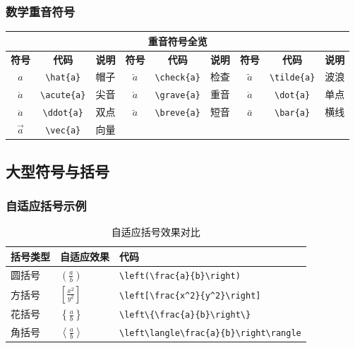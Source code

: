 \documentclass{article}
\begin{document}
\subsubsection{数学重音符号}
\begin{center}
\footnotesize
\begin{tabular}{ccc|ccc|ccc}
\hline
\multicolumn{9}{c}{\normalsize\textbf{重音符号全览}} \\
\hline
\textbf{符号} & \textbf{代码} & \textbf{说明} & \textbf{符号} & \textbf{代码} & \textbf{说明} & \textbf{符号} & \textbf{代码} & \textbf{说明} \\
\hline
$\hat{a}$ & \verb|\hat{a}| & 帽子 & $\check{a}$ & \verb|\check{a}| & 检查 & $\tilde{a}$ & \verb|\tilde{a}| & 波浪 \\
$\acute{a}$ & \verb|\acute{a}| & 尖音 & $\grave{a}$ & \verb|\grave{a}| & 重音 & $\dot{a}$ & \verb|\dot{a}| & 单点 \\
$\ddot{a}$ & \verb|\ddot{a}| & 双点 & $\breve{a}$ & \verb|\breve{a}| & 短音 & $\bar{a}$ & \verb|\bar{a}| & 横线 \\
$\vec{a}$ & \verb|\vec{a}| & 向量 & & & & & & \\
\hline
\end{tabular}
\end{center}

\subsection{大型符号与括号}

\subsubsection{自适应括号示例}
\begin{table}[H]
\centering
\renewcommand{\arraystretch}{2.0}
\begin{tabular}{>{\centering}p{2cm}>{\centering}p{2cm}>{\centering\arraybackslash}p{8cm}}
\hline
\textbf{括号类型} & \textbf{自适应效果} & \textbf{代码} \\
\hline
圆括号 & $\left(\frac{a}{b}\right)$ & \lstinline|\left(\frac{a}{b}\right)| \\
\hline
方括号 & $\left[\frac{x^2}{y^2}\right]$ & \lstinline|\left[\frac{x^2}{y^2}\right]| \\
\hline
花括号 & $\left\{\frac{a}{b}\right\}$ & \lstinline|\left\{\frac{a}{b}\right\}| \\
\hline
角括号 & $\left\langle\frac{a}{b}\right\rangle$ & \lstinline|\left\langle\frac{a}{b}\right\rangle| \\
\hline
\end{tabular}
\caption{自适应括号效果对比}
\end{table}
\end{document}

